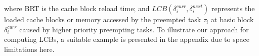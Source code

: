 \newline
\noindent 
where BRT is the cache block reload time; and \begin{math}\textit{LCB}(\delta_{i}^{curr},\delta_{i}^{next})\end{math} represents the loaded cache blocks or memory accessed by the preempted task \begin{math}\tau_{i}\end{math} at basic block \begin{math}\delta_{i}^{curr}\end{math} caused by higher priority preempting tasks.
To illustrate our approach for computing LCBs, a suitable example is presented in the appendix due to space limitations here.
